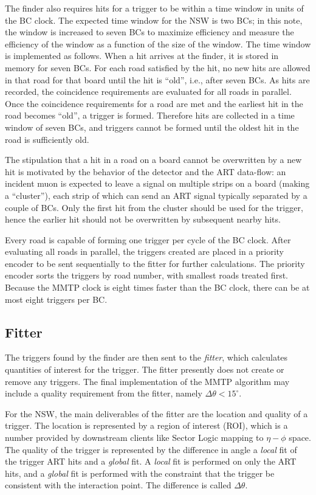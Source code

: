 The finder also requires hits for a trigger to be within a time window in units of the BC clock. The expected time window for the NSW is two BCs; in this note, the window is increased to seven BCs to maximize efficiency and measure the efficiency of the window as a function of the size of the window. The time window is implemented as follows. When a hit arrives at the finder, it is stored in memory for seven BCs. For each road satisfied by the hit, no new hits are allowed in that road for that board until the hit is ``old'', i.e., after seven BCs. As hits are recorded, the coincidence requirements are evaluated for all roads in parallel. Once the coincidence requirements for a road are met and the earliest hit in the road becomes ``old'', a trigger is formed. Therefore hits are collected in a time window of seven BCs, and triggers cannot be formed until the oldest hit in the road is sufficiently old.

The stipulation that a hit in a road on a board cannot be overwritten by a new hit is motivated by the behavior of the detector and the ART data-flow: an incident muon is expected to leave a signal on multiple strips on a board (making a ``cluster''), each strip of which can send an ART signal typically separated by a couple of BCs. Only the first hit from the cluster should be used for the trigger, hence the earlier hit should not be overwritten by subsequent nearby hits. 

Every road is capable of forming one trigger per cycle of the BC clock. After evaluating all roads in parallel, the triggers created are placed in a priority encoder to be sent sequentially to the fitter for further calculations. The priority encoder sorts the triggers by road number, with smallest roads treated first. Because the MMTP clock is eight times faster than the BC clock, there can be at most eight triggers per BC.

\subsection{Fitter}
\label{sec:alg-fitter}

The triggers found by the finder are then sent to the \textit{fitter}, which calculates quantities of interest for the trigger. The fitter presently does not create or remove any triggers. The final implementation of the MMTP algorithm may include a quality requirement from the fitter, namely $\Delta\theta < 15^\circ$.

For the NSW, the main deliverables of the fitter are the location and quality of a trigger. The location is represented by a region of interest (ROI), which is a number provided by downstream clients like Sector Logic mapping to $\eta-\phi$ space. The quality of the trigger is represented by the difference in angle a \textit{local} fit of the trigger ART hits and a \textit{global} fit. A \textit{local} fit is performed on only the ART hits, and a \textit{global} fit is performed with the constraint that the trigger be consistent with the interaction point. The difference is called $\Delta\theta$.

